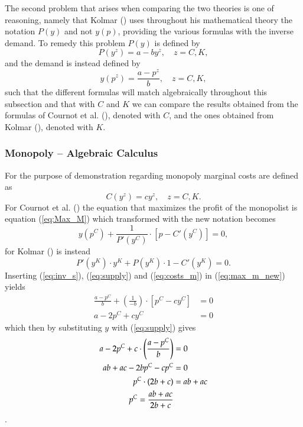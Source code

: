 \documentclass[12pt]{article}
\numberwithin{equation}{subsection}
\begin{document}
The second problem that arises when comparing the two theories is one of reasoning, namely that Kolmar (\citeyear{Kolmar_2022}) uses throughout his mathematical theory the notation $P(y)$ and not $y(p)$, providing the various formulas with the inverse demand. To remedy this problem $P(y)$ is defined by \begin{equation}
\label{eq:inv_s}
P(y^z) = a - by^z, \quad z = C, K,
\end{equation}
and the demand is instead defined by \begin{equation}
\label{eq:supply}
y(p^z) = \frac{a - p^z}{b}, \quad z = C, K,
\end{equation}
such that the different formulas will match algebraically throughout this subsection and that with $C$ and $K$ we can compare the results obtained from the formulas of Cournot et al. (\citeyear{cournot1897researches}), denoted with $C$, and the ones obtained from Kolmar (\citeyear{Kolmar_2022}), denoted with $K$.

\subsubsection{Monopoly -- Algebraic Calculus}
\label{sec:m}
For the purpose of demonstration regarding monopoly marginal costs are  defined as \begin{equation}
\label{eq:costs_m}
C(y^z) = cy^z, \quad z = C, K.
\end{equation}
For Cournot et al. (\citeyear{cournot1897researches}) the equation that maximizes the profit of the monopolist is equation (\ref{eq:Max_M}) which transformed with the new notation becomes \begin{equation}
\label{eq:max_m_new}
y(p^C) + \frac{1}{P'(y^C)} \cdot \left[p - C'(y^C) \right] = 0, 
\end{equation}
for Kolmar (\citeyear[p. 406]{Kolmar_2022}) is instead \begin{equation}
\label{eq:max_m_kolmar}
P'(y^K) \cdot y^K + P(y^K) \cdot 1 - C'(y^K) = 0.
\end{equation}
Inserting (\ref{eq:inv_s}), (\ref{eq:supply}) and (\ref{eq:costs_m}) in (\ref{eq:max_m_new}) yields \begin{align*}
\frac{a - p^C}{b} + \left(\frac{1}{- b}\right) \cdot [p^C - cy^C] & = 0 \\
a - 2p^C + cy^C & = 0
\end{align*}
which then by substituting $y$ with (\ref{eq:supply}) gives  \begin{align}
\label{eq:price_m_c}
a - 2p^C + c \cdot \left(\frac{a - p^C}{b}\right) & = 0 \notag \\
ab + ac - 2bp^C - cp^C & = 0 \notag \\
p^C \cdot (2b + c)  & = ab + ac \notag \\
p^C = \frac{ab + ac}{2b + c}
\end{align}.
\end{document}
